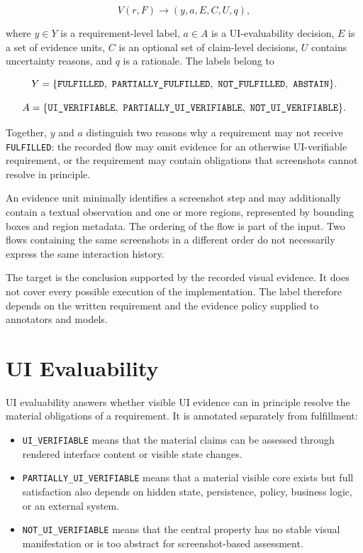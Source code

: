 \[
V(r, F) \rightarrow (y, a, E, C, U, q),
\]

where \(y\in Y\) is a requirement-level label, \(a\in A\) is a UI-evaluability
decision, \(E\) is a set of evidence units, \(C\) is an optional set of
claim-level decisions, \(U\) contains uncertainty reasons, and \(q\) is a
rationale. The labels belong to

\[
Y = \{\texttt{FULFILLED},\ \texttt{PARTIALLY\_\allowbreak FULFILLED},\
\texttt{NOT\_FULFILLED},\ \texttt{ABSTAIN}\}.
\]

\[
A = \{\texttt{UI\_VERIFIABLE},\
\texttt{PARTIALLY\_\allowbreak UI\_\allowbreak VERIFIABLE},\
\texttt{NOT\_UI\_VERIFIABLE}\}.
\]

Together, \(y\) and \(a\) distinguish two reasons why a requirement may not
receive \texttt{FULFILLED}: the recorded flow may omit evidence for an otherwise
UI-verifiable requirement, or the requirement may contain obligations that
screenshots cannot resolve in principle.

An evidence unit minimally identifies a screenshot step and may additionally
contain a textual observation and one or more regions, represented by bounding
boxes and region metadata. The ordering of the flow is part of the input. Two
flows containing the same screenshots in a different order do not necessarily
express the same interaction history.

The target is the conclusion supported by the recorded visual evidence. It does
not cover every possible execution of the implementation. The label therefore
depends on the written requirement and the evidence policy supplied to
annotators and models.

\section{UI Evaluability}\label{ui-evaluability}

UI evaluability answers whether visible UI evidence can in principle resolve
the material obligations of a requirement. It is annotated separately from
fulfillment:

\begin{itemize}
\tightlist
\item
  \texttt{UI\_VERIFIABLE} means that the material claims can be assessed through
  rendered interface content or visible state changes.
\item
  \texttt{PARTIALLY\_\allowbreak UI\_\allowbreak VERIFIABLE} means that a material visible core exists but full
  satisfaction also depends on hidden state, persistence, policy, business
  logic, or an external system.
\item
  \texttt{NOT\_UI\_VERIFIABLE} means that the central property has no stable visual
  manifestation or is too abstract for screenshot-based assessment.
\end{itemize}

